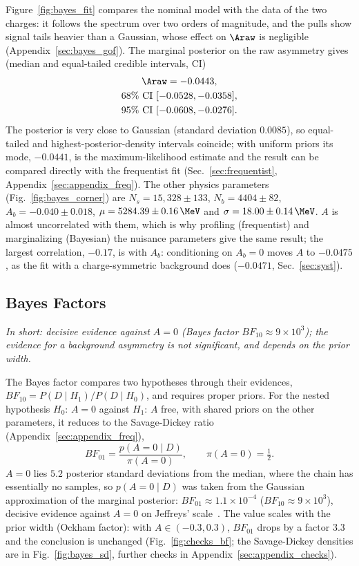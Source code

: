 Figure~\ref{fig:bayes_fit} compares the nominal model with the data of the two charges: it follows the spectrum over two orders of magnitude, and the pulls show signal tails heavier than a Gaussian, whose effect on $\Araw$ is negligible (Appendix~\ref{sec:bayes_gof}). The marginal posterior on the raw asymmetry gives (median and equal-tailed credible intervals, CI)
\begin{gather*}
\Araw = -0.0443, \\
68\%~\text{CI}~[-0.0528,-0.0358], \\ 95\%~\text{CI}~[-0.0608,-0.0276].
\end{gather*}
The posterior is very close to Gaussian (standard deviation $0.0085$), so equal-tailed and highest-posterior-density intervals coincide; with uniform priors its mode, $-0.0441$, is the maximum-likelihood estimate and the result can be compared directly with the frequentist fit (Sec.~\ref{sec:frequentist}, Appendix~\ref{sec:appendix_freq}). The other physics parameters (Fig.~\ref{fig:bayes_corner}) are $N_s=15{,}328\pm133$, $N_b=4404\pm82$, $A_b=-0.040\pm0.018$, $\mu=5284.39\pm0.16\,\MeV$ and $\sigma=18.00\pm0.14\,\MeV$. $A$ is almost uncorrelated with them, which is why profiling (frequentist) and marginalizing (Bayesian) the nuisance parameters give the same result; the largest correlation, $-0.17$, is with $A_b$: conditioning on $A_b=0$ moves $A$ to $-0.0475$, as the fit with a charge-symmetric background does ($-0.0471$, Sec.~\ref{sec:syst}).




\subsection{Bayes Factors}
\label{sec:bayes_factor}
\emph{In short: decisive evidence against $A=0$ (Bayes factor $BF_{10}\approx9\times10^3$); the evidence for a background asymmetry is not significant, and depends on the prior width.}

The Bayes factor compares two hypotheses through their evidences, $BF_{10}=P(D\mid H_1)/P(D\mid H_0)$, and requires proper priors. For the nested hypothesis $H_0$: $A=0$ against $H_1$: $A$ free, with shared priors on the other parameters, it reduces to the Savage-Dickey ratio~\cite{dickey1971} (Appendix~\ref{sec:appendix_freq}),
\[
BF_{01} = \frac{p(A=0\mid D)}{\pi(A=0)}, \qquad \pi(A=0)=\tfrac12 .
\]
$A=0$ lies $5.2$ posterior standard deviations from the median, where the chain has essentially no samples, so $p(A=0\mid D)$ was taken from the Gaussian approximation of the marginal posterior: $BF_{01}\approx1.1\times10^{-4}$ ($BF_{10}\approx9\times10^{3}$), decisive evidence against $A=0$ on Jeffreys' scale~\cite{jeffreys}. The value scales with the prior width (Ockham factor): with $A\in(-0.3,0.3)$, $BF_{01}$ drops by a factor $3.3$ and the conclusion is unchanged (Fig.~\ref{fig:checks_bf}; the Savage-Dickey densities are in Fig.~\ref{fig:bayes_sd}, further checks in Appendix~\ref{sec:appendix_checks}).

